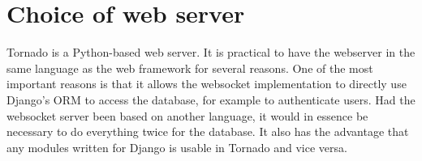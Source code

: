 \section{Choice of web server}
Tornado\cite{tornadoweb11} is a Python-based web server. 
It is practical to have the webserver in the same language as the web framework 
for several reasons. One of the most important reasons is that it allows the 
websocket implementation to directly use Django's ORM to access the database, 
for example to authenticate users. Had the websocket server been based on 
another language, it would in essence be necessary to do everything twice for 
the database. 
It also has the advantage that any modules written for Django is 
usable in Tornado and vice versa.
